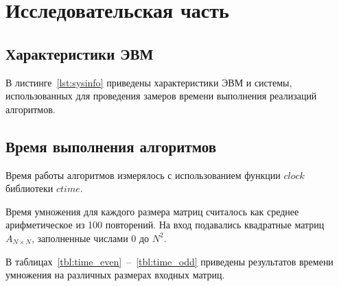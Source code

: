 \chapter{Исследовательская часть}

\section{Характеристики ЭВМ}

В листинге~\ref{lst:sysinfo} приведены характеристики ЭВМ и системы, использованных для проведения замеров времени выполнения реализаций алгоритмов.


\clearpage

\section{Время выполнения алгоритмов}

Время работы алгоритмов измерялось с использованием функции
$clock$ библиотеки $ctime$.

Время умножения для каждого размера матриц считалось как среднее арифметическое из 100 повторений. На вход подавались квадратные матриц $A_{N \times N}$, заполненные числами $0$ до $N^2$.

В таблицах~\ref{tbl:time_even}~--~\ref{tbl:time_odd} приведены результатов времени умножения на различных размерах входных матриц.

